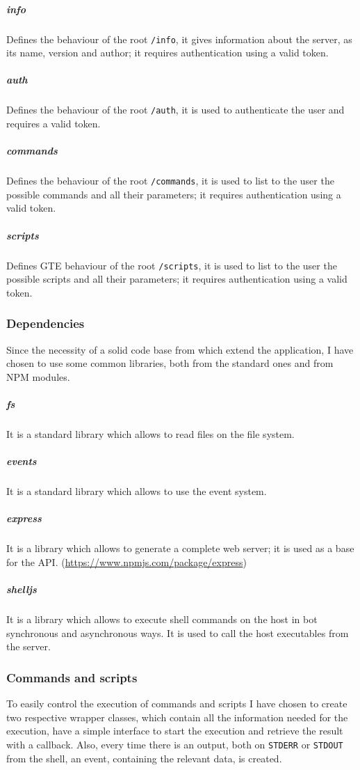 \documentclass[../PiTest.tex]{subfiles}
\begin{document}
    \subparagraph{info}
    Defines the behaviour of the root \texttt{/info}, it gives information about the server, as its name, version and author; it requires authentication using a valid token.

    \subparagraph{auth}
    Defines the behaviour of the root \texttt{/auth}, it is used to authenticate the user and requires a valid token.

    \subparagraph{commands}
    Defines the behaviour of the root \texttt{/commands}, it is used to list to the user the possible commands and all their parameters; it requires authentication using a valid token.

    \subparagraph{scripts}
    Defines GTE behaviour of the root \texttt{/scripts}, it is used to list to the user the possible scripts and all their parameters; it requires authentication using a valid token.

    \subsubsection{Dependencies}
    Since the necessity of a solid code base from which extend the application, I have chosen to use some common libraries, both from the standard \nodejs ones and from NPM modules.

    \subparagraph{fs}
    It is a \nodejs standard library which allows to read files on the file system.

    \subparagraph{events}
    It is a \nodejs standard library which allows to use the event system.

    \subparagraph{express}
    It is a \npm library which allows to generate a complete web server; it is used as a base for the \REST API. (\url{https://www.npmjs.com/package/express})

    \subparagraph{shelljs}
    It is a \npm library which allows to execute shell commands on the host in bot synchronous and asynchronous ways. It is used to call the host executables from the server.
    

    \subsubsection{Commands and scripts}
    To easily control the execution of commands and scripts I have chosen to create two respective wrapper classes, which contain all the information needed for the execution, have a simple interface to start the execution and retrieve the result with a callback. Also, every time there is an output, both on \texttt{STDERR} or \texttt{STDOUT} from the shell, an event, containing the relevant data, is created.
\end{document}
